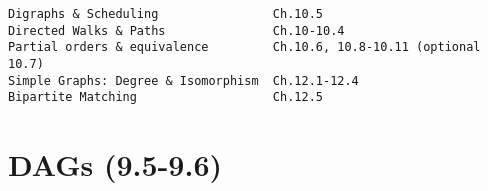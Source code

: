 \documentclass[handout]{mcs}
\begin{document}
\renewcommand{\reading}{
\begin{itemize}
\item Chapter~\bref{digraphs_chap}.\ \emph{Directed Graphs} (omit~\bref{poset-as-sets_sec}).
\item Chapter~\bref{simple_graphs_chap}.\ \emph{Simple Graphs} through~\bref{bipartitesec} 
\end{itemize}}


\begin{staffnotes}
\begin{verbatim}
Digraphs & Scheduling                Ch.10.5
Directed Walks & Paths               Ch.10-10.4
Partial orders & equivalence         Ch.10.6, 10.8-10.11 (optional 10.7)
Simple Graphs: Degree & Isomorphism  Ch.12.1-12.4
Bipartite Matching                   Ch.12.5
\end{verbatim}
\end{staffnotes}




\section*{DAGs (9.5-9.6)}



\end{document}
